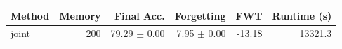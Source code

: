 \begin{tabular}{lrrrrr}
\toprule
Method & Memory & Final Acc. & Forgetting & FWT & Runtime (s) \\
\midrule
joint & 200 & 79.29 $\pm$ 0.00 & 7.95 $\pm$ 0.00 & -13.18 & 13321.3 \\
\bottomrule
\end{tabular}

